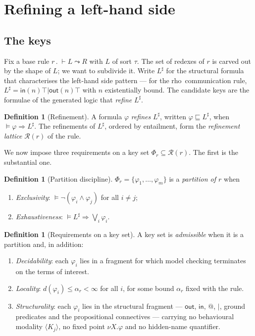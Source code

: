 \documentclass[11pt,a4paper]{article}
\theoremstyle{plain}
\theoremstyle{definition}
\newtheorem{definition}[theorem]{Definition}
\theoremstyle{remark}
\newcommand{\rhoc}{\textsf{rho}}
\newcommand{\sepc}{\mathbin{\big|}}
\newcommand{\out}{\mathsf{out}}
\newcommand{\inn}{\mathsf{in}}
\newcommand{\dpt}{d}
\begin{document}
\section{Refining a left-hand side}
\label{sec:refinement}

\subsection{The keys}

Fix a base rule $r \,.\; \vdash L \leadsto R$ with $L$ of sort $\tau$. The set of redexes of $r$ is
carved out by the shape of $L$; we want to subdivide it. Write $L^\sharp$ for the structural formula
that characterises the left-hand side pattern --- for the \rhoc\ communication rule,
$L^\sharp = \inn(n)\top \sepc \out(n)\top$ with $n$ existentially bound. The candidate keys are the
formulae of the generated logic that \emph{refine} $L^\sharp$.

\begin{definition}[Refinement]
\label{def:refinement}
A formula $\varphi$ \emph{refines} $L^\sharp$, written $\varphi \sqsubseteq L^\sharp$, when
$\models \varphi \Rightarrow L^\sharp$. The refinements of $L^\sharp$, ordered by entailment, form
the \emph{refinement lattice} $\mathcal{R}(r)$ of the rule.
\end{definition}

We now impose three requirements on a key set $\Phi_r \subseteq \mathcal{R}(r)$. The first is the
substantial one.

\begin{definition}[Partition discipline]
\label{def:partition}
$\Phi_r = \{\varphi_1, \ldots, \varphi_m\}$ is a \emph{partition of $r$} when
\begin{enumerate}[label=(P\arabic*),leftmargin=3em]
\item \emph{Exclusivity}: $\models \neg(\varphi_i \wedge \varphi_j)$ for all $i \neq j$;
\item \emph{Exhaustiveness}: $\models L^\sharp \Rightarrow \bigvee_{i} \varphi_i$.
\end{enumerate}
\end{definition}

\begin{definition}[Requirements on a key set]
\label{def:reqs}
A key set is \emph{admissible} when it is a partition and, in addition:
\begin{enumerate}[label=(R\arabic*),leftmargin=3em]
\item\label{req:dec} \emph{Decidability}: each $\varphi_i$ lies in a fragment for which model
checking terminates on the terms of interest.
\item\label{req:loc} \emph{Locality}: $\dpt(\varphi_i) \le \alpha_r < \infty$ for all $i$, for some
bound $\alpha_r$ fixed with the rule.
\item\label{req:str} \emph{Structurality}: each $\varphi_i$ lies in the structural fragment ---
$\out$, $\inn$, $@$, $\sepc$, ground predicates and the propositional connectives --- carrying no
behavioural modality $\langle K_j\rangle$, no fixed point $\nu X.\varphi$ and no hidden-name
quantifier.
\end{enumerate}
\end{definition}
\end{document}
